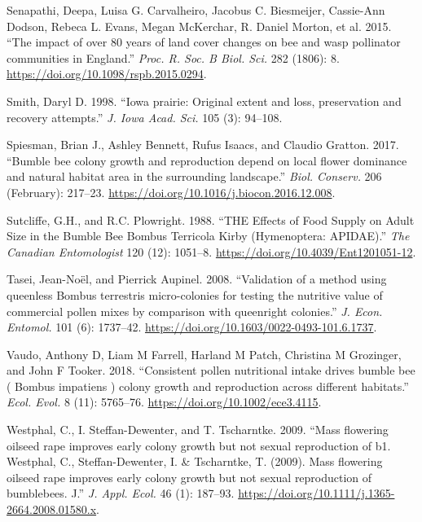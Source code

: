 \documentclass[11pt,]{article}
\begin{document}
\leavevmode\hypertarget{ref-Senapathi2015a}{}%
Senapathi, Deepa, Luisa G. Carvalheiro, Jacobus C. Biesmeijer,
Cassie-Ann Dodson, Rebeca L. Evans, Megan McKerchar, R. Daniel Morton,
et al. 2015. ``The impact of over 80 years of land cover changes on bee
and wasp pollinator communities in England.'' \emph{Proc. R. Soc. B
Biol. Sci.} 282 (1806): 8. \url{https://doi.org/10.1098/rspb.2015.0294}.

\leavevmode\hypertarget{ref-Smith1998}{}%
Smith, Daryl D. 1998. ``Iowa prairie: Original extent and loss,
preservation and recovery attempts.'' \emph{J. Iowa Acad. Sci.} 105 (3):
94--108.

\leavevmode\hypertarget{ref-Spiesman2017}{}%
Spiesman, Brian J., Ashley Bennett, Rufus Isaacs, and Claudio Gratton.
2017. ``Bumble bee colony growth and reproduction depend on local flower
dominance and natural habitat area in the surrounding landscape.''
\emph{Biol. Conserv.} 206 (February): 217--23.
\url{https://doi.org/10.1016/j.biocon.2016.12.008}.

\leavevmode\hypertarget{ref-Sutcliffe1988}{}%
Sutcliffe, G.H., and R.C. Plowright. 1988. ``THE Effects of Food Supply
on Adult Size in the Bumble Bee Bombus Terricola Kirby (Hymenoptera:
APIDAE).'' \emph{The Canadian Entomologist} 120 (12): 1051--8.
\url{https://doi.org/10.4039/Ent1201051-12}.

\leavevmode\hypertarget{ref-Tasei2008}{}%
Tasei, Jean-Noël, and Pierrick Aupinel. 2008. ``Validation of a method
using queenless Bombus terrestris micro-colonies for testing the
nutritive value of commercial pollen mixes by comparison with queenright
colonies.'' \emph{J. Econ. Entomol.} 101 (6): 1737--42.
\url{https://doi.org/10.1603/0022-0493-101.6.1737}.

\leavevmode\hypertarget{ref-Vaudo2018}{}%
Vaudo, Anthony D, Liam M Farrell, Harland M Patch, Christina M
Grozinger, and John F Tooker. 2018. ``Consistent pollen nutritional
intake drives bumble bee ( Bombus impatiens ) colony growth and
reproduction across different habitats.'' \emph{Ecol. Evol.} 8 (11):
5765--76. \url{https://doi.org/10.1002/ece3.4115}.

\leavevmode\hypertarget{ref-Westphal2009a}{}%
Westphal, C., I. Steffan-Dewenter, and T. Tscharntke. 2009. ``Mass
flowering oilseed rape improves early colony growth but not sexual
reproduction of b1. Westphal, C., Steffan-Dewenter, I. \& Tscharntke, T.
(2009). Mass flowering oilseed rape improves early colony growth but not
sexual reproduction of bumblebees. J.'' \emph{J. Appl. Ecol.} 46 (1):
187--93. \url{https://doi.org/10.1111/j.1365-2664.2008.01580.x}.
\end{document}
